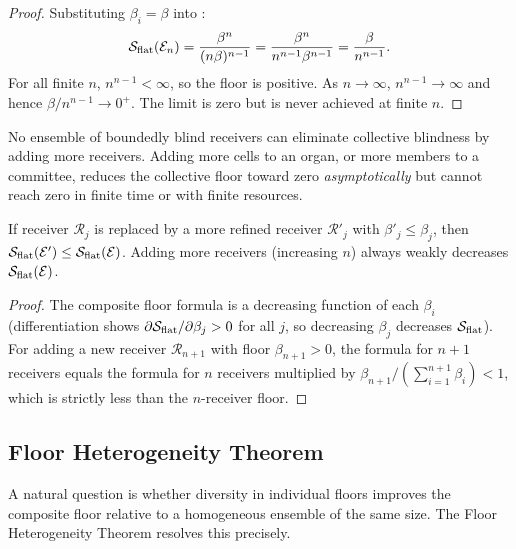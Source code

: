 \begin{proof}
Substituting $\beta_i = \beta$ into :
\[
  \mathcal{S}_{\mathrm{flat}}(\mathcal{E}_n)
  = \frac{\beta^n}{(n\beta)^{n-1}}
  = \frac{\beta^n}{n^{n-1}\beta^{n-1}}
  = \frac{\beta}{n^{n-1}} .
\]
For all finite $n$, $n^{n-1} < \infty$, so the floor is positive.  As
$n \to \infty$, $n^{n-1} \to \infty$ and hence $\beta/n^{n-1} \to 0^+$.
The limit is zero but is never achieved at finite $n$.
\end{proof}

\begin{corollary}
\label{cor:blindness-non-eliminable}
No ensemble of boundedly blind receivers can eliminate collective blindness
by adding more receivers.  Adding more cells to an organ, or more members to
a committee, reduces the collective floor toward zero \emph{asymptotically}
but cannot reach zero in finite time or with finite resources.
\end{corollary}

\begin{proposition}
\label{prop:reachability-monotonicity}
If receiver $\mathcal{R}_j$ is replaced by a more refined receiver
$\mathcal{R}'_j$ with $\beta'_j \leq \beta_j$, then
$\mathcal{S}_{\mathrm{flat}}(\mathcal{E}') \leq \mathcal{S}_{\mathrm{flat}}(\mathcal{E})$.
Adding more receivers (increasing $n$) always weakly decreases
$\mathcal{S}_{\mathrm{flat}}(\mathcal{E})$.
\end{proposition}

\begin{proof}
The composite floor formula is a decreasing function of each $\beta_i$
(differentiation shows $\partial \mathcal{S}_{\mathrm{flat}} / \partial \beta_j > 0$ for
all $j$, so decreasing $\beta_j$ decreases $\mathcal{S}_{\mathrm{flat}}$).  For adding a
new receiver $\mathcal{R}_{n+1}$ with floor $\beta_{n+1} > 0$, the formula
for $n+1$ receivers equals the formula for $n$ receivers multiplied by
$\beta_{n+1}/(\sum_{i=1}^{n+1}\beta_i) < 1$, which is strictly less than the
$n$-receiver floor.
\end{proof}

\subsection{Floor Heterogeneity Theorem}

A natural question is whether diversity in individual floors improves the
composite floor relative to a homogeneous ensemble of the same size.  The
Floor Heterogeneity Theorem resolves this precisely.


